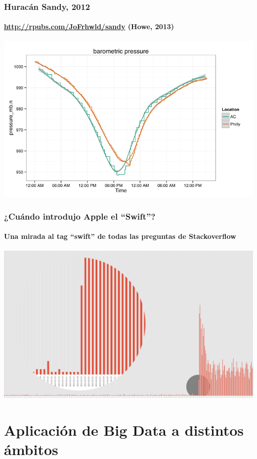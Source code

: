 \documentclass[14pt]{beamer}
\begin{document}
\begin{frame}
  \frametitle{Huracán Sandy, 2012}
  \framesubtitle{\url{http://rpubs.com/JoFrhwld/sandy} (Howe, 2013)}
\includegraphics[width=\textwidth]{img/sandy}
\end{frame}

\begin{frame}
  \frametitle{¿Cuándo introdujo Apple el ``Swift''?}
  \framesubtitle{Una mirada al tag ``swift'' de todas las preguntas de
    Stackoverflow}
\includegraphics[width=\textwidth]{img/swift-tag}
\end{frame}

\section{Aplicación de Big Data a distintos ámbitos}
\end{document}
